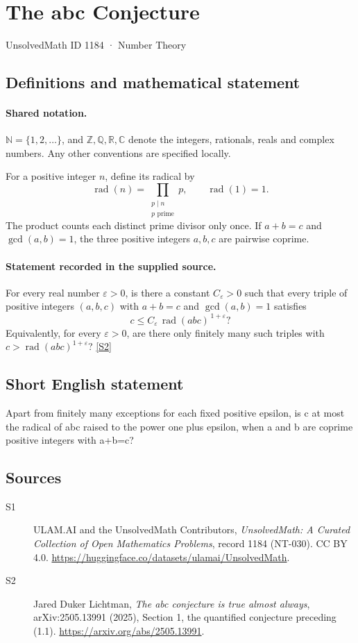 \documentclass[11pt]{article}
\newcommand{\sref}[2]{\hyperlink{source:#1:#2}{[S#2]}}
\begin{document}
\setcounter{section}{1183}
\section{The abc Conjecture}\label{1184}
{\small\sffamily UnsolvedMath ID 1184 · Number Theory}
\subsection{Definitions and mathematical statement}

\paragraph{Shared notation.}$\mathbb N=\{1,2,\ldots\}$, and $\mathbb Z,\mathbb Q,\mathbb R,\mathbb C$ denote the integers, rationals, reals and complex numbers. Any other conventions are specified locally.


For a positive integer \(n\), define its radical by
\[
 \operatorname{rad}(n)=\prod_{\substack{p\mid n\\p\text{ prime}}}p,
 \qquad \operatorname{rad}(1)=1.
\]
The product counts each distinct prime divisor only once.
If \(a+b=c\) and \(\gcd(a,b)=1\), the three positive integers
\(a,b,c\) are pairwise coprime.
\paragraph{Statement recorded in the supplied source.}
For every real number \(\varepsilon>0\), is there a constant
\(C_\varepsilon>0\) such that every triple of positive integers
\((a,b,c)\) with \(a+b=c\) and \(\gcd(a,b)=1\) satisfies
\[
 c\le C_\varepsilon\,\operatorname{rad}(abc)^{\,1+\varepsilon}?
\]
Equivalently, for every \(\varepsilon>0\), are there only finitely many
such triples with \(c>\operatorname{rad}(abc)^{1+\varepsilon}\)? \sref{1184}{2}
\subsection{Short English statement}
Apart from finitely many exceptions for each fixed positive epsilon, is c at most the radical of abc raised to the power one plus epsilon, when a and b are coprime positive integers with a+b=c?
\subsection{Sources}
\begin{description}
\item[\hypertarget{source:1184:1}{S1}] ULAM.AI and the UnsolvedMath Contributors, \emph{UnsolvedMath: A Curated Collection of Open Mathematics Problems}, record 1184 (NT-030). CC BY 4.0. \url{https://huggingface.co/datasets/ulamai/UnsolvedMath}.
\item[\hypertarget{source:1184:2}{S2}] Jared Duker Lichtman, \emph{The abc conjecture is true almost always}, arXiv:2505.13991 (2025), Section 1, the quantified conjecture preceding (1.1). \url{https://arxiv.org/abs/2505.13991}.
\end{description}
\label{end:1184}
\end{document}
